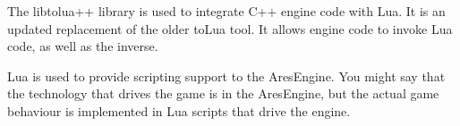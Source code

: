 

\startitemize[4]

The libtolua++ library is used to integrate C++ engine code with Lua. It is an updated replacement of the older toLua tool. It allows engine code to invoke Lua code, as well as the inverse.


Lua is used to provide scripting support to the AresEngine. You might say that the technology that drives the game is in the AresEngine, but the actual game behaviour is implemented in Lua scripts that drive the engine.
\stopitemize

